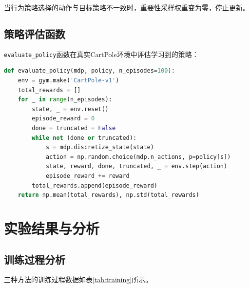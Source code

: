\documentclass[12pt,a4paper]{article}
\begin{document}
当行为策略选择的动作与目标策略不一致时，重要性采样权重变为零，停止更新。

\subsection{策略评估函数}

\texttt{evaluate\_policy}函数在真实CartPole环境中评估学习到的策略：

\begin{lstlisting}[language=Python]
def evaluate_policy(mdp, policy, n_episodes=100):
    env = gym.make('CartPole-v1')
    total_rewards = []
    for _ in range(n_episodes):
        state, _ = env.reset()
        episode_reward = 0
        done = truncated = False
        while not (done or truncated):
            s = mdp.discretize_state(state)
            action = np.random.choice(mdp.n_actions, p=policy[s])
            state, reward, done, truncated, _ = env.step(action)
            episode_reward += reward
        total_rewards.append(episode_reward)
    return np.mean(total_rewards), np.std(total_rewards)
\end{lstlisting}

\section{实验结果与分析}

\subsection{训练过程分析}

三种方法的训练过程数据如表\ref{tab:training}所示。
\end{document}
